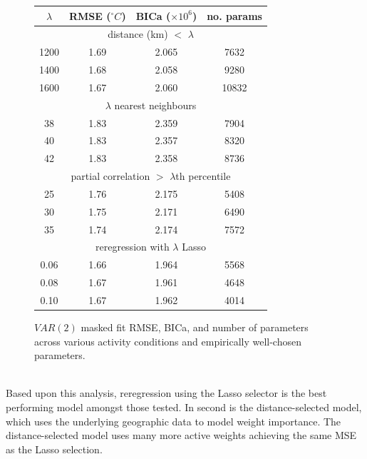 \documentclass[12pt,a4paper]{article} %
\begin{document}
\begin{figure}[!ht]
    \centering
    \begin{tabular}{|c|c|c|c|}
        \hline
        $\lambda$ & RMSE ($^\circ C$) & BICa ($\times10^6$) & no. params \\
        \hline
        \multicolumn{4}{|c|}{distance (km) $<$ $\lambda$}\\
        \hline
        1200 & 1.69 & 2.065 & 7632 \\
        \hline
        1400 & 1.68 & 2.058 & 9280 \\
        \hline
        1600 & 1.67 & 2.060 & 10832 \\
        \hline
        \multicolumn{4}{|c|}{$\lambda$ nearest neighbours}\\
        \hline
        38 & 1.83 & 2.359 & 7904 \\
        \hline
        40 & 1.83 & 2.357 & 8320 \\
        \hline
        42 & 1.83 & 2.358 & 8736 \\
        \hline
        \multicolumn{4}{|c|}{partial correlation $>$ $\lambda$th percentile}\\
        \hline
        25 & 1.76 & 2.175 & 5408 \\
        \hline
        30 & 1.75 & 2.171 & 6490 \\
        \hline
        35 & 1.74 & 2.174 & 7572 \\
        \hline
        \multicolumn{4}{|c|}{reregression with $\lambda$ Lasso}\\
        \hline
        0.06 & 1.66 & 1.964 & 5568 \\
        \hline
        0.08 & 1.67 & 1.961 & 4648 \\
        \hline
        0.10 & 1.67 & 1.962 & 4014 \\
        \hline
    \end{tabular}
    \caption{$VAR(2)$ masked fit RMSE, BICa, and number of parameters across various activity conditions and empirically well-chosen parameters.}
    \label{fig:masking}
\end{figure}
\\ Based upon this analysis, reregression using the Lasso selector is the best performing model amongst those tested. In second is the distance-selected model, which uses the underlying geographic data to model weight importance. The distance-selected model uses many more active weights achieving the same MSE as the Lasso selection.
\end{document}
